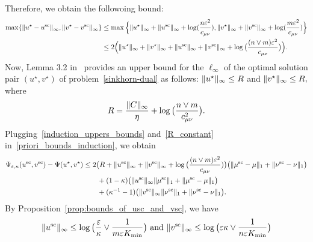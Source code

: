 Therefore, we obtain the followoing bound:
\begin{align}
\label{induction_uppers_bounds}
\max\{\norm{u^\star - u^{\text{sc}}}_\infty, \norm{v^\star - v^{\text{sc}}}_\infty\} %
&\leq \max\Big\{\norm{u^\star}_\infty + \norm{u^{\text{sc}}}_\infty +  \log(\frac{n\varepsilon^2}{c_{\mu\nu}}), \norm{v^\star}_\infty + \norm{v^{\text{sc}}}_\infty + \log(\frac{m\varepsilon^2}{c_{\mu\nu}})\Big\}\nonumber\\
&\leq 2\Big(\norm{u^\star}_\infty + \norm{v^\star}_\infty +  \norm{u^{\text{sc}}}_\infty +  \norm{v^{\text{sc}}}_\infty + \log\big(\frac{(n\vee m)\varepsilon^2}{c_{\mu\nu}}\big)\Big).
\end{align}
Now, Lemma 3.2 in~\cite{lin2019} provides an upper bound for the $\ell_\infty$ of the optimal solution pair $(u^\star, v^\star)$ of problem~\eqref{sinkhorn-dual} as follows:
$\|u^\star\|_\infty \leq R$ and $\|v^\star\|_\infty\leq R,$ where 
\begin{align}
\label{R_constant}
R = \frac{\|C\|_\infty}{\eta} + \log\big(\frac{n\vee m}{c^2_{\mu\nu}}\big).
\end{align}
Plugging~\eqref{induction_uppers_bounds} and~\eqref{R_constant} in~\eqref{priori_bounds_induction}, we obtain
\begin{align}
\Psi_{\varepsilon, \kappa}(u^{\text{sc}} ,v^{\text{sc}}) -\Psi(u^\star, v^\star) 
&\leq 2\big(R + \|u^{\text{sc}}\|_\infty +  \|v^{\text{sc}}\|_\infty + \log\big(\frac{(n\vee m)\varepsilon^2}{c_{\mu\nu}})\big) \big(\|\mu^{\text{sc}} - \mu\|_1+ \|\nu^{\text{sc}} - \nu\|_1\big)\nonumber\\
&\qquad + (1- \kappa)\big(\|{u}^{\text{sc}}\|_\infty\|{\mu}^{\text{sc}}\|_1 +\|\mu^{\text{sc}} - \mu\|_1\big)\label{post_bounds_induction_2}\\
&\qquad  + (\kappa^{-1} - 1)\big(\|{v}^{\text{sc}}\|_\infty\|{\nu}^{\text{sc}}\|_1+\|\nu^{\text{sc}} - \nu\|_1\big)\nonumber.
\end{align}
By Proposition~\ref{prop:bounds_of_usc_and_vsc}, we have 
\begin{align*} %
\norm{u^{\text{sc}}}_\infty \leq \log\big(\frac \varepsilon\kappa\vee \frac{1}{m\varepsilon K_{\min}}\big) \text{ and } \norm{v^{\text{sc}}}_\infty \leq \log\big(\varepsilon\kappa \vee \frac{1}{n\varepsilon K_{\min} }\big)
\end{align*}
